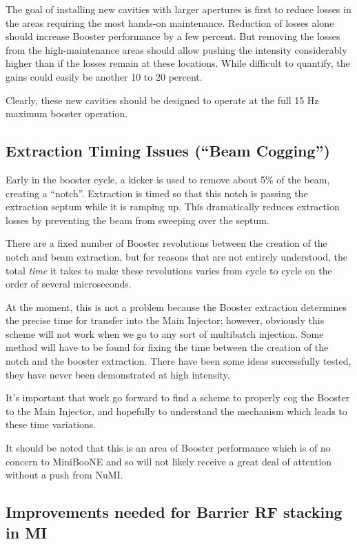 \documentclass{article}
\begin{document}
The goal of installing new cavities with larger apertures is first to reduce 
losses in the areas requiring the most hands-on maintenance.  Reduction of 
losses alone should increase Booster performance by a few percent.  But 
removing the losses from the high-maintenance areas should allow pushing the 
intensity considerably higher than if the losses remain at these locations.  
While difficult to quantify, the gains could easily be another 10 to 20 
percent.

Clearly, these new cavities should be designed to operate at the
full 15 Hz maximum booster operation.

\subsection {Extraction Timing Issues (``Beam Cogging'')}

Early in the booster cycle, a kicker is used to remove about
5\% of the beam, creating a ``notch''.  Extraction is timed
so that this notch is passing the extraction septum while 
it is ramping up.  This dramatically reduces extraction losses
by preventing the beam from sweeping over the septum.

There are a fixed number of Booster revolutions between the
creation of the notch and beam extraction, but for reasons
that are not entirely understood, the total {\em time} it takes
to make these revolutions varies from cycle to cycle on the order
of several microseconds.  

At the moment, this is not a problem because the Booster extraction
determines the precise time for transfer into the Main Injector; however,
obviously this scheme will not work when we go to any sort of multibatch
injection.  Some method will have to be found for fixing the time
between the creation of the notch and the booster extraction.  There
have been some ideas successfully tested, they have never been
demonstrated at high intensity.

It's important that work go forward to find a scheme to properly
cog the Booster to the Main Injector, and hopefully to understand
the mechanism which leads to these time variations.

It should be noted that this is an area of Booster performance 
which is of no concern to MiniBooNE and so will not likely 
receive a great deal of attention without a push from NuMI.

\subsection {Improvements needed for Barrier RF stacking in MI}
\end{document}
